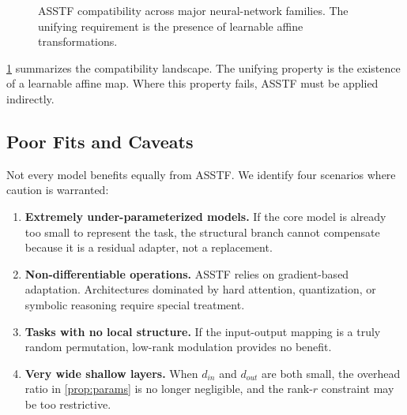 \documentclass[11pt,a4paper]{article}
\theoremstyle{definition}
\begin{document}
\begin{figure}[t]
\centering
{}
\caption{ASSTF compatibility across major neural-network families. The unifying requirement is the presence of learnable affine transformations.}
\label{fig:compatibility}
\end{figure}

\cref{fig:compatibility} summarizes the compatibility landscape. The unifying property is the existence of a learnable affine map. Where this property fails, ASSTF must be applied indirectly.

\subsection{Poor Fits and Caveats}
\label{subsec:poor_fits}

Not every model benefits equally from ASSTF. We identify four scenarios where caution is warranted:

\begin{enumerate}
    \item \textbf{Extremely under-parameterized models.} If the core model is already too small to represent the task, the structural branch cannot compensate because it is a residual adapter, not a replacement.
    
    \item \textbf{Non-differentiable operations.} ASSTF relies on gradient-based adaptation. Architectures dominated by hard attention, quantization, or symbolic reasoning require special treatment.
    
    \item \textbf{Tasks with no local structure.} If the input-output mapping is a truly random permutation, low-rank modulation provides no benefit.
    
    \item \textbf{Very wide shallow layers.} When $d_{in}$ and $d_{out}$ are both small, the overhead ratio in \cref{prop:params} is no longer negligible, and the rank-$r$ constraint may be too restrictive.
\end{enumerate}
\end{document}

